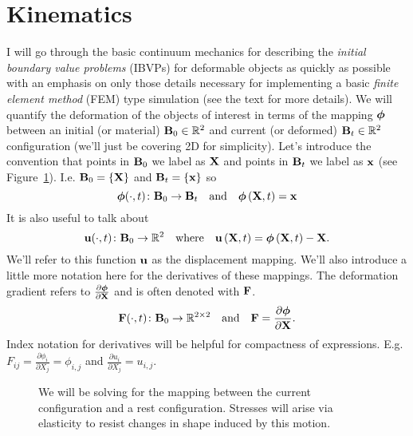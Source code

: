 
\section*{Kinematics}

I will go through the basic continuum mechanics for describing the \emph{initial boundary value problems} (IBVPs) for deformable objects as quickly as possible with an emphasis on only those details necessary for implementing a basic \emph{finite element method} (FEM) type simulation (see the text \cite{Bonet_Wood_2008} for more details). We will quantify the deformation of the objects of interest in terms of the mapping $\boldsymbol{\phi}$ between an initial (or material) $\mathbf{B}_0 \in \mathbb{R}^2$ and current (or deformed) $\mathbf{B}_t \in \mathbb{R}^2$ configuration (we'll just be covering 2D for simplicity). Let's introduce the convention that points in $\mathbf{B}_0$ we label as $\mathbf{X}$ and points in $\mathbf{B}_t$ we label as $\mathbf{x}$ (see Figure~\ref{fig:phi}). I.e. $\mathbf{B}_0 = \left\{ \mathbf{X} \right\}$ and $\mathbf{B}_t = \left\{ \mathbf{x} \right\}$ so
\begin{equation*}
\boldsymbol{\phi}(\cdot,t) \colon \mathbf{B}_0 \to \mathbf{B}_t \quad \text{and} \quad \boldsymbol{\phi} \left( \mathbf{X}, t \right) = \mathbf{x}
\end{equation*}
It is also useful to talk about
\begin{equation*}
\mathbf{u}(\cdot,t) \colon \mathbf{B}_0 \to \mathbb{R}^2 \quad \text{where} \quad \mathbf{u} \left( \mathbf{X}, t \right) = \boldsymbol{\phi} \left( \mathbf{X}, t \right) - \mathbf{X}.
\end{equation*}
We'll refer to this function $\mathbf{u}$ as the displacement mapping. We'll also introduce a little more notation here for the derivatives of these mappings. The deformation gradient refers to $\frac{\partial\boldsymbol{\phi}}{\partial\mathbf{X}}$ and is often denoted with $\mathbf{F}$.
\begin{equation*}
\mathbf{F}(\cdot,t) \colon \mathbf{B}_0 \to \mathbb{R}^{2\times2} \quad \text{and} \quad \mathbf{F} = \frac{\partial\boldsymbol{\phi}}{\partial\mathbf{X}}.
\end{equation*}
Index notation for derivatives will be helpful for compactness of expressions. E.g. $F_{ij} = \frac{\partial\phi_i}{\partial X_j} = \phi_{i,j}$ and $\frac{\partial u_i}{\partial X_j} = u_{i,j}$.
\begin{figure}
\caption{We will be solving for the mapping between the current configuration and a rest configuration. Stresses will arise via elasticity to resist changes in shape induced by this motion.}
\label{fig:phi}
\end{figure}

